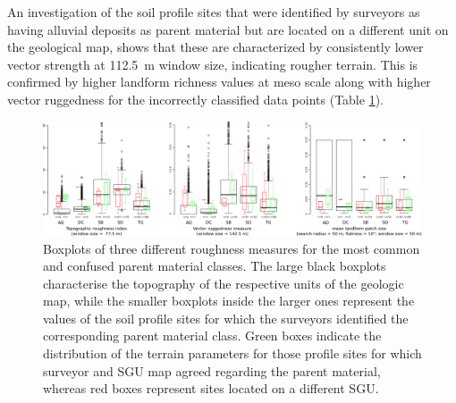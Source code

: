 \documentclass[preprint,12pt,authoryear]{elsarticle}
\begin{document}
An investigation of the soil profile sites that were identified by surveyors as having alluvial deposits as parent material but are located on a different unit on the geological map, shows that these are characterized by consistently lower vector strength at 112.5~m window size, indicating rougher terrain. This is confirmed by higher landform richness values at meso scale along with higher vector ruggedness for the incorrectly classified data points (Table \ref{fig:boxplots}). 
 \begin{figure}[ht!]
\includegraphics[width=\textwidth,angle=0]{boxplots_roughness.pdf}
\caption{Boxplots of three different roughness measures for the most common and confused parent material classes. The large black boxplots characterise the topography of the respective units of the geologic map, while the smaller boxplots inside the larger ones represent the values of the soil profile sites for which the surveyors identified the corresponding parent material class. Green boxes indicate the distribution of the terrain parameters for those profile sites for which surveyor and SGU map agreed regarding the parent material, whereas red boxes represent sites located on a different SGU.}
\label{fig:boxplots}
\end{figure}
\end{document}
